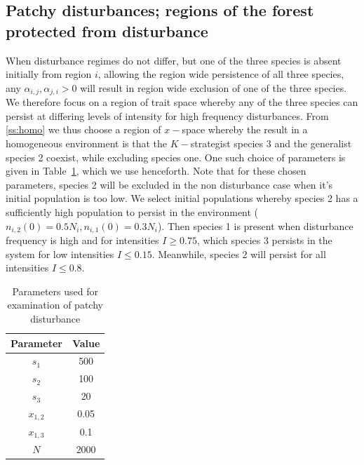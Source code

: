 \subsection{Patchy disturbances; regions of the forest protected from disturbance}
When disturbance regimes do not differ, but one of the three species is absent initially from region $i$, allowing the region wide persistence of all three species, any $\alpha_{i,j},\alpha_{j,i}>0$ will result in region wide exclusion of one of the three species. We therefore focus on a region of trait space whereby any of the three species can persist at differing levels of intensity for high frequency disturbances. From \ref{ss:homo} we thus choose a region of $x-$space whereby the result in a homogeneous environment is that the $K-$strategist species 3 and the generalist species 2 coexist, while excluding species one. One such choice of parameters is given in Table~\ref{tab:paras}, which we use henceforth. Note that for these chosen parameters, species 2 will be excluded in the non disturbance case when it's initial population is too low. We select initial populations whereby species 2 has a sufficiently high population to persist in the environment ($n_{i,2}(0)=0.5N_i,n_{i,1}(0)=0.3N_i$). Then species 1 is present when disturbance frequency is high and for intensities $I\geq0.75$, which species 3 persists in the system for low intensities $I\leq 0.15$. Meanwhile, species 2 will persist for all intensities $I\leq 0.8$.
\begin{table}[htdp]
\begin{center}
\begin{tabular}{|c|c|} \hline
Parameter & Value\\ \hline
$s_1$&500\\
$s_2$&100\\
$s_3$&20\\
$x_{1,2}$&0.05\\
$x_{1,3}$&0.1\\
$N$&2000\\ \hline
\end{tabular}
\end{center}
\caption{Parameters used for examination of patchy disturbance}
\label{tab:paras}
\end{table}
